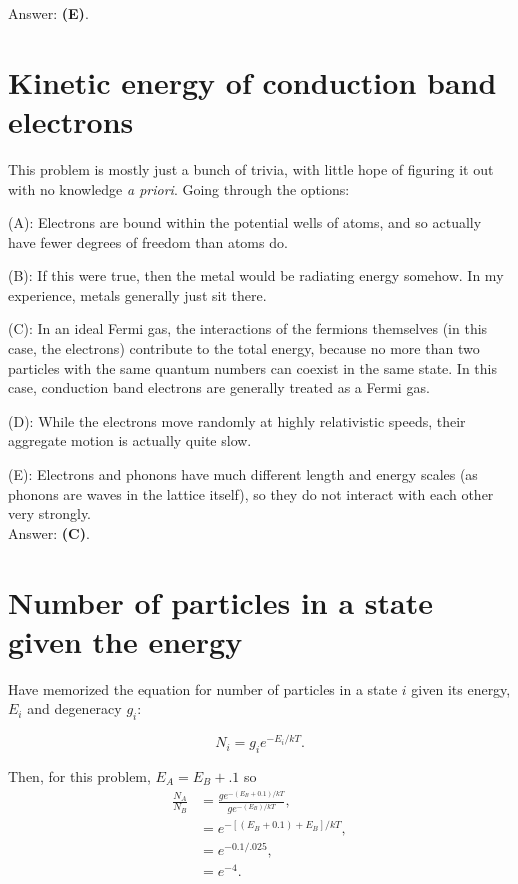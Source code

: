 \documentclass[11pt]{paper}
\newcommand{\answer}[1]{Answer: \textbf{(#1)}.}
\begin{document}
\answer{E}

\section{Kinetic energy of conduction band electrons}
This problem is mostly just a bunch of trivia, with little hope of figuring it out with no knowledge \emph{a priori}.  Going through the options:

(A): Electrons are bound within the potential wells of atoms, and so actually have fewer degrees of freedom than atoms do.

(B): If this were true, then the metal would be radiating energy somehow.  In my experience, metals generally just sit there.

(C): In an ideal Fermi gas, the interactions of the fermions themselves (in this case, the electrons) contribute to the total energy, because no more than two particles with the same quantum numbers can coexist in the same state.  In this case, conduction band electrons are generally treated as a Fermi gas.

(D): While the electrons move randomly at highly relativistic speeds, their aggregate motion is actually quite slow.

(E): Electrons and phonons have much different length and energy scales (as phonons are waves in the lattice itself), so they do not interact with each other very strongly.\\

\answer{C}

\section{Number of particles in a state given the energy}

Have memorized the equation for number of particles in a state $i$ given its energy, $E_i$ and degeneracy $g_i$:

\begin{equation}
N_i = g_ie^{-E_i/kT}.
\end{equation}

Then, for this problem, $E_A = E_B+.1$ so
\begin{align}
\frac{N_A}{N_B} &= \frac{g e^{-(E_B+0.1)/kT}}{g e^{-(E_B)/kT}},\\
&=e^{-[(E_B+0.1)+E_B]/kT},\\
&=e^{-0.1/.025},\\
&=e^{-4}.
\end{align}
\end{document}
